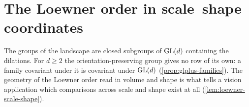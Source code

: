 \setcounter{section}{1}

\section{The Loewner order in scale--shape coordinates}
\label{sec:scale-shape}

The groups of the landscape are closed subgroups of $\mathrm{GL}(d)$ containing the dilations. For $d \ge 2$
the orientation-preserving group gives no row of its own: a family covariant under it is covariant
under $\mathrm{GL}(d)$ (\ref{prop:glplus-families}). The geometry of the Loewner order read in volume and shape
is what tells a vision application which comparisons across scale and shape exist at all
(\ref{lem:loewner-scale-shape}).

